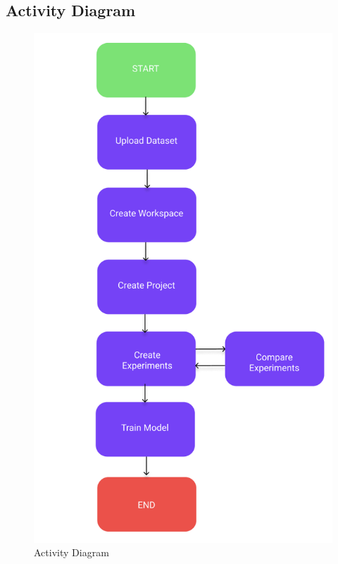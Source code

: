 \documentclass[12pt,a4paper]{report}     %
\begin{document}
\begin{normalsize}
{{{\subsection{Activity Diagram}
\begin{figure}[H]
    \centering
    \includegraphics[scale=0.9]{diagrams/Activity_diagram.png}
        \caption{Activity Diagram}
    \label{}
\end{figure}
}}}
\end{normalsize}
\end{document}
